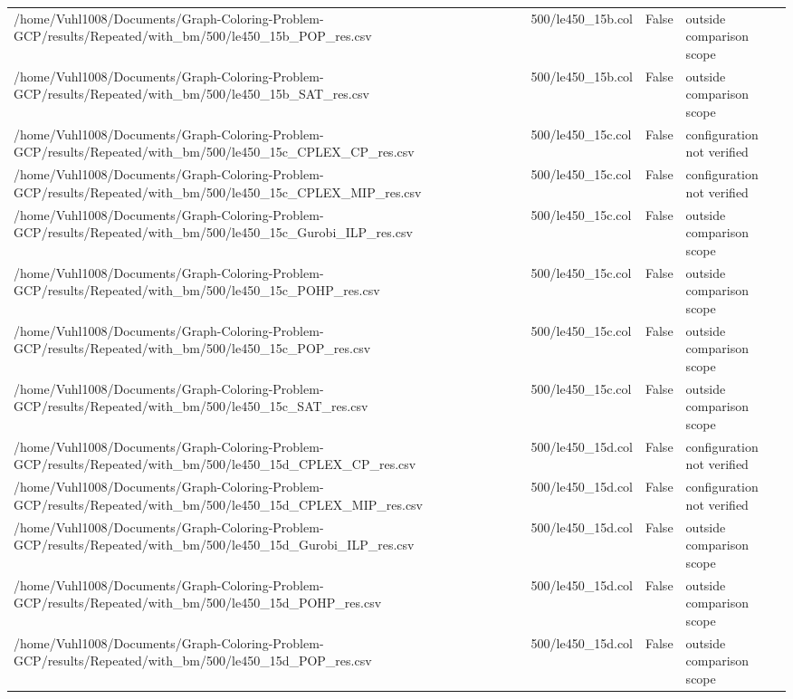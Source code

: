 \begin{table}[htbp]
\begin{tabular}{llll}
/home/Vuhl1008/Documents/Graph-Coloring-Problem-GCP/results/Repeated/with\_bm/500/le450\_15b\_POP\_res.csv & 500/le450\_15b.col & False & outside comparison scope \\
/home/Vuhl1008/Documents/Graph-Coloring-Problem-GCP/results/Repeated/with\_bm/500/le450\_15b\_SAT\_res.csv & 500/le450\_15b.col & False & outside comparison scope \\
/home/Vuhl1008/Documents/Graph-Coloring-Problem-GCP/results/Repeated/with\_bm/500/le450\_15c\_CPLEX\_CP\_res.csv & 500/le450\_15c.col & False & configuration not verified \\
/home/Vuhl1008/Documents/Graph-Coloring-Problem-GCP/results/Repeated/with\_bm/500/le450\_15c\_CPLEX\_MIP\_res.csv & 500/le450\_15c.col & False & configuration not verified \\
/home/Vuhl1008/Documents/Graph-Coloring-Problem-GCP/results/Repeated/with\_bm/500/le450\_15c\_Gurobi\_ILP\_res.csv & 500/le450\_15c.col & False & outside comparison scope \\
/home/Vuhl1008/Documents/Graph-Coloring-Problem-GCP/results/Repeated/with\_bm/500/le450\_15c\_POHP\_res.csv & 500/le450\_15c.col & False & outside comparison scope \\
/home/Vuhl1008/Documents/Graph-Coloring-Problem-GCP/results/Repeated/with\_bm/500/le450\_15c\_POP\_res.csv & 500/le450\_15c.col & False & outside comparison scope \\
/home/Vuhl1008/Documents/Graph-Coloring-Problem-GCP/results/Repeated/with\_bm/500/le450\_15c\_SAT\_res.csv & 500/le450\_15c.col & False & outside comparison scope \\
/home/Vuhl1008/Documents/Graph-Coloring-Problem-GCP/results/Repeated/with\_bm/500/le450\_15d\_CPLEX\_CP\_res.csv & 500/le450\_15d.col & False & configuration not verified \\
/home/Vuhl1008/Documents/Graph-Coloring-Problem-GCP/results/Repeated/with\_bm/500/le450\_15d\_CPLEX\_MIP\_res.csv & 500/le450\_15d.col & False & configuration not verified \\
/home/Vuhl1008/Documents/Graph-Coloring-Problem-GCP/results/Repeated/with\_bm/500/le450\_15d\_Gurobi\_ILP\_res.csv & 500/le450\_15d.col & False & outside comparison scope \\
/home/Vuhl1008/Documents/Graph-Coloring-Problem-GCP/results/Repeated/with\_bm/500/le450\_15d\_POHP\_res.csv & 500/le450\_15d.col & False & outside comparison scope \\
/home/Vuhl1008/Documents/Graph-Coloring-Problem-GCP/results/Repeated/with\_bm/500/le450\_15d\_POP\_res.csv & 500/le450\_15d.col & False & outside comparison scope \\

\end{tabular}
\end{table}
